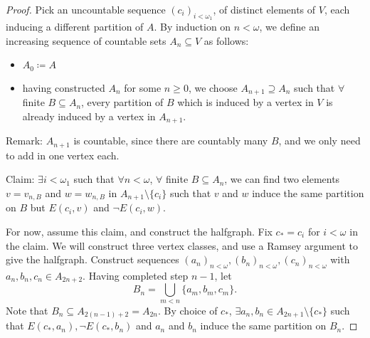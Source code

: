 \documentclass{article}
\begin{document}
\begin{proof}
  Pick an uncountable sequence $(c_i)_{i < \omega_1}$, of distinct elements of $V$, each inducing a different partition of $A$.
  By induction on $n < \omega$, we define an increasing sequence of countable sets $A_n \subseteq V$ as follows:
  \begin{itemize}[label=--]
    \item $A_0 \coloneqq A$
    \item having constructed $A_n$ for some $n \geq 0$, we choose $A_{n+1} \supseteq A_n$ such that $\forall$ finite $B \subseteq A_n$, every partition of $B$ which is induced by a vertex in $V$ is already induced by a vertex in $A_{n+1}$.
  \end{itemize}
  Remark: $A_{n+1}$ is countable, since there are countably many $B$, and we only need to add in one vertex each.
  \begin{center}
  \end{center}
  Claim: $\exists i < \omega_1$ such that $\forall n < \omega$, $\forall$ finite $B \subseteq A_n$, we can find two elements $v = v_{n,B}$ and $w = w_{n,B}$ in $A_{n+1} \setminus \{c_i\}$ such that $v$ and $w$ induce the same partition on $B$ but $E(c_i,v)$ and $\neg E(c_i,w)$.

  For now, assume this claim, and construct the halfgraph.
  Fix $c_* = c_i$ for $i < \omega$ in the claim. We will construct three vertex classes, and use a Ramsey argument to give the halfgraph. Construct sequences $(a_n)_{n < \omega}, (b_n)_{n < \omega}, (c_n)_{n < \omega}$ with $a_n, b_n, c_n \in A_{2n+2}$.
  Having completed step $n-1$, let
  \begin{equation*}
    B_n = \bigcup_{m < n} \{a_m, b_m, c_m\}.
  \end{equation*}
  Note that $B_n \subseteq A_{2(n-1)+2} = A_{2n}$.
  By choice of $c_*$, $\exists a_n, b_n \in A_{2n+1} \setminus \{c_*\}$ such that $E(c_*, a_n), \neg E(c_*, b_n)$ and $a_n$ and $b_n$ induce the same partition on $B_n$.


\end{proof}
\end{document}
